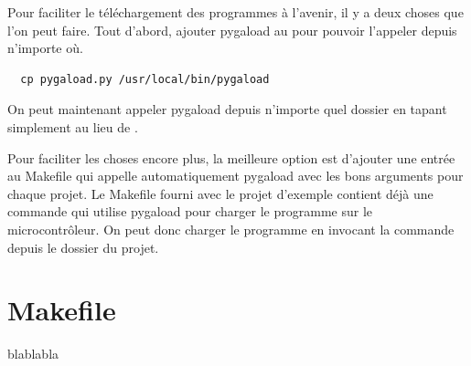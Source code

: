 Pour faciliter le téléchargement des programmes à l'avenir, il y a deux choses
que l'on peut faire. Tout d'abord, ajouter pygaload au  pour pouvoir
l'appeler depuis n'importe où.

\begin{lstlisting}
  cp pygaload.py /usr/local/bin/pygaload
\end{lstlisting}

On peut maintenant appeler pygaload depuis n'importe quel dossier en tapant
simplement  au lieu de .

Pour faciliter les choses encore plus, la meilleure option est d'ajouter une
entrée au Makefile qui appelle automatiquement pygaload avec les bons arguments
pour chaque projet. Le Makefile fourni avec le projet d'exemple contient déjà
une commande  qui utilise pygaload pour charger le programme sur le
microcontrôleur. On peut donc charger le programme en invocant la commande
 depuis le dossier du projet.

\section{Makefile}
blablabla







